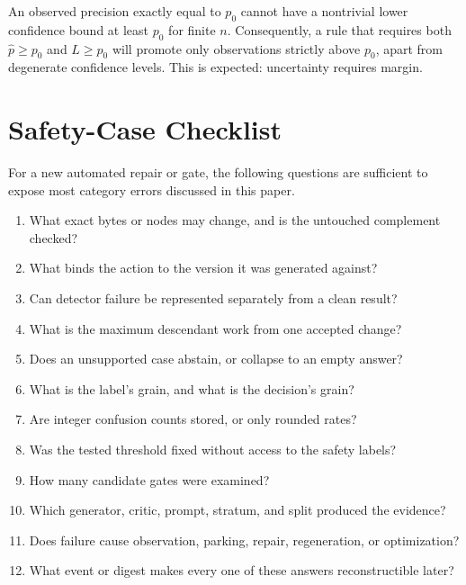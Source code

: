 \documentclass[11pt]{article}
\begin{document}
An observed precision exactly equal to $p_0$ cannot have a nontrivial lower confidence bound
at least $p_0$ for finite $n$. Consequently, a rule that requires both
$\widehat p\ge p_0$ and $L\ge p_0$ will promote only observations strictly above $p_0$, apart
from degenerate confidence levels. This is expected: uncertainty requires margin.

\section{Safety-Case Checklist}

For a new automated repair or gate, the following questions are sufficient to expose most
category errors discussed in this paper.

\begin{enumerate}
  \item What exact bytes or nodes may change, and is the untouched complement checked?
  \item What binds the action to the version it was generated against?
  \item Can detector failure be represented separately from a clean result?
  \item What is the maximum descendant work from one accepted change?
  \item Does an unsupported case abstain, or collapse to an empty answer?
  \item What is the label's grain, and what is the decision's grain?
  \item Are integer confusion counts stored, or only rounded rates?
  \item Was the tested threshold fixed without access to the safety labels?
  \item How many candidate gates were examined?
  \item Which generator, critic, prompt, stratum, and split produced the evidence?
  \item Does failure cause observation, parking, repair, regeneration, or optimization?
  \item What event or digest makes every one of these answers reconstructible later?
\end{enumerate}
\end{document}
